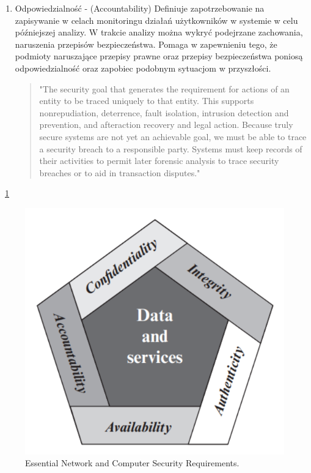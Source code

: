 \documentclass[runningheads,12pt]{llncs}
\begin{document}
\begin{enumerate}
    \item Odpowiedzialność - (Accountability) Definiuje zapotrzebowanie na zapisywanie w celach monitoringu działań użytkowników w systemie w celu późniejszej analizy. W trakcie analizy można wykryć podejrzane zachowania, naruszenia przepisów bezpieczeństwa. Pomaga w zapewnieniu tego, że podmioty naruszające przepisy prawne oraz przepisy bezpieczeństwa poniosą odpowiedzialność oraz zapobiec podobnym sytuacjom w przyszłości.
    \begin{quote}
        "The security goal that generates the requirement for actions of an entity to be traced uniquely to that entity. This supports nonrepudiation, deterrence, fault isolation, intrusion detection and prevention, and afteraction recovery and legal action. Because truly secure systems are not yet an achievable goal, we must be able to trace a security breach to a responsible party. Systems must keep records of their activities to permit later forensic analysis to trace security breaches or to aid in transaction disputes." ~\cite[p. 23]{stallings2017cryptography}
    \end{quote}
\end{enumerate}

~\ref{fig1}

\begin{figure}
    \includegraphics[width=\linewidth]{images/image-security.png}
    \caption{Essential Network and Computer Security Requirements.} \label{fig1}
\end{figure}
\end{document}
